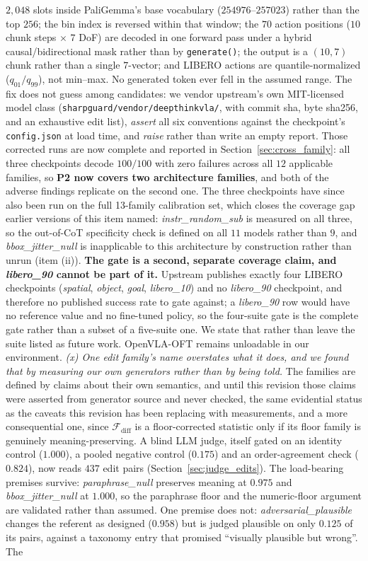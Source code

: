 \documentclass{article}
\begin{document}
$2{,}048$ slots inside PaliGemma's base vocabulary ($254976$--$257023$) rather than the top $256$; the bin index is reversed within that window; the $70$ action positions ($10$ chunk steps $\times$ $7$ DoF) are decoded in one forward pass under a hybrid causal/bidirectional mask rather than by \texttt{generate()}; the output is a $(10,7)$ chunk rather than a single $7$-vector; and LIBERO actions are quantile-normalized ($q_{01}/q_{99}$), not min--max. No generated token ever fell in the assumed range. The fix does not guess among candidates: we vendor upstream's own MIT-licensed model class (\texttt{sharpguard/vendor/deepthinkvla/}, with commit sha, byte sha256, and an exhaustive edit list), \emph{assert} all six conventions against the checkpoint's \texttt{config.json} at load time, and \emph{raise} rather than write an empty report. Those corrected runs are now complete and reported in Section~\ref{sec:cross_family}: all three checkpoints decode $100/100$ with zero failures across all $12$ applicable families, so \textbf{P2 now covers two architecture families}, and both of the adverse findings replicate on the second one. The three checkpoints have since also been run on the full 13-family calibration set, which closes the coverage gap earlier versions of this item named: \emph{instr\_random\_sub} is measured on all three, so the out-of-CoT specificity check is defined on all $11$ models rather than $9$, and \emph{bbox\_jitter\_null} is inapplicable to this architecture by construction rather than unrun (item (ii)). \textbf{The gate is a second, separate coverage claim, and \emph{libero\_90} cannot be part of it.} Upstream publishes exactly four LIBERO checkpoints (\emph{spatial}, \emph{object}, \emph{goal}, \emph{libero\_10}) and no \emph{libero\_90} checkpoint, and therefore no published success rate to gate against; a \emph{libero\_90} row would have no reference value and no fine-tuned policy, so the four-suite gate is the complete gate rather than a subset of a five-suite one. We state that rather than leave the suite listed as future work. OpenVLA-OFT remains unloadable in our environment. \emph{(x) One edit family's name overstates what it does, and we found that by measuring our own generators rather than by being told.} The families are defined by claims about their own semantics, and until this revision those claims were asserted from generator source and never checked, the same evidential status as the caveats this revision has been replacing with measurements, and a more consequential one, since $\mathcal{F}_{\text{diff}}$ is a floor-corrected statistic only if its floor family is genuinely meaning-preserving. A blind LLM judge, itself gated on an identity control ($1.000$), a pooled negative control ($0.175$) and an order-agreement check ($0.824$), now reads $437$ edit pairs (Section~\ref{sec:judge_edits}). The load-bearing premises survive: \emph{paraphrase\_null} preserves meaning at $0.975$ and \emph{bbox\_jitter\_null} at $1.000$, so the paraphrase floor and the numeric-floor argument are validated rather than assumed. One premise does not: \emph{adversarial\_plausible} changes the referent as designed ($0.958$) but is judged plausible on only $\mathbf{0.125}$ of its pairs, against a taxonomy entry that promised ``visually plausible but wrong''. The 
\end{document}
